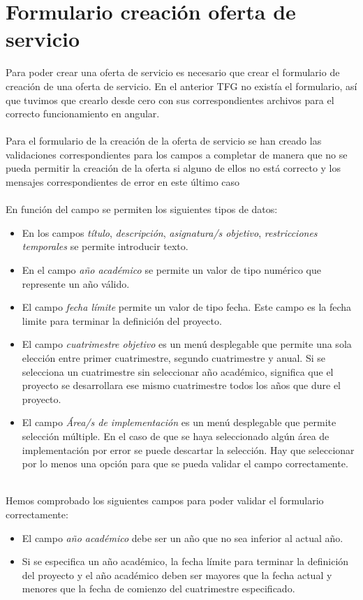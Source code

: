\documentclass[11pt]{book}
\begin{document}
\section{Formulario creación oferta de servicio}
Para poder crear una oferta de servicio es necesario que crear el formulario de creación de una oferta de servicio. En el anterior TFG no existía el formulario, así que tuvimos que crearlo desde cero con sus correspondientes archivos para el correcto funcionamiento en angular.\\\\
Para el formulario de la creación de la oferta de servicio se han creado las validaciones correspondientes para los campos a completar de manera que no se pueda permitir la creación de la oferta si alguno de ellos no está correcto y los mensajes correspondientes de error en este último caso\\\\
En función del campo se permiten los siguientes tipos de datos: \\
\begin{itemize} 
	\item En los campos \emph{título}, \emph{descripción}, \emph{asignatura/s objetivo}, \emph{restricciones temporales} se permite introducir texto.
	\item En el campo \emph{año académico} se permite un valor de tipo numérico que represente un año válido.
	\item El campo \emph{fecha límite} permite un valor de tipo fecha. Este campo es la fecha limite para terminar la definición del proyecto.
	\item  El campo \emph{cuatrimestre objetivo} es un menú desplegable que permite una sola elección entre primer cuatrimestre, segundo cuatrimestre y anual. Si se selecciona un cuatrimestre sin seleccionar año académico, significa que el proyecto se desarrollara ese mismo cuatrimestre todos los años que dure el proyecto.
	\item El campo \emph{Área/s de implementación} es un menú desplegable que permite selección múltiple. En el caso de que se haya seleccionado algún área de implementación por error se puede descartar la selección. Hay que seleccionar por lo menos una opción para que se pueda validar el campo correctamente.\\\\
\end{itemize}
Hemos comprobado los siguientes campos para poder validar el formulario correctamente:
\begin{itemize} 
\item	El campo \emph{año académico} debe ser un año que no sea inferior al actual año.
\item	Si se especifica un año académico, la fecha límite para terminar la definición del proyecto y el año académico deben ser mayores que la fecha actual y menores que la fecha de comienzo del cuatrimestre especificado.\\\\
\end{itemize}
\end{document}
